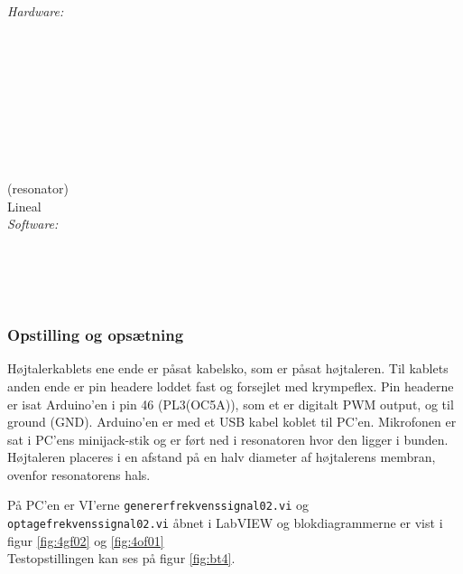 		\textit{Hardware:}\\
		\tores\\
		\hojtalerkabel\\
		\kabelsko\\
		\pins\\
		\krympeflex\\
		\arduino\\
		\mikrofon\\
		\PC\\
		\usbkabel\\
		 (resonator)\\
		Lineal\\
	
		\textit{Software:}\\
		\labview\\
		\visa\\
		\vi\\
		\ardsw\\
		
		
		\subsubsection{Opstilling og opsætning}
		
		Højtalerkablets ene ende er påsat kabelsko, som er påsat højtaleren. Til kablets anden ende er pin headere loddet fast og forsejlet med krympeflex. Pin headerne er isat Arduino'en i pin 46 (PL3(OC5A)), som et er digitalt PWM output, og til ground (GND). 
		Arduino'en er med et USB kabel koblet til PC'en.	
		Mikrofonen er sat i PC'ens minijack-stik og er ført ned i resonatoren hvor den ligger i bunden. Højtaleren placeres i en afstand på en halv diameter af højtalerens membran, ovenfor resonatorens hals. 
		
		På PC'en er VI'erne \texttt{genererfrekvenssignal02.vi} og \texttt{optagefrekvenssignal02.vi} åbnet i LabVIEW og blokdiagrammerne er vist i figur \ref{fig:4gf02} og \ref{fig:4of01} \\ Testopstillingen kan ses på figur \ref{fig:bt4}.  
		
\vspace{5mm}
		
